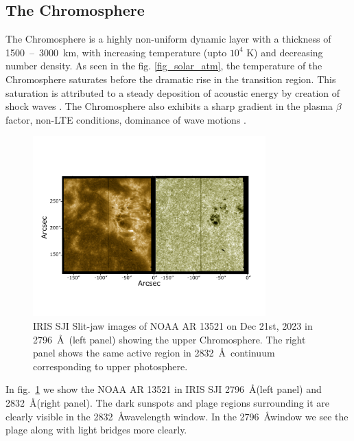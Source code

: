\subsection{The Chromosphere}\label{chromosphere}

The Chromosphere is a highly non-uniform dynamic layer with a thickness of 1500~--~3000~km, with increasing temperature (upto $10^{4}$ K) and decreasing number density. As seen in the fig. \ref{fig_solar_atm}, the temperature of the Chromosphere saturates before the dramatic rise in the transition region. This saturation is attributed to a steady deposition of acoustic energy by creation of shock waves \citep{carlsson07}. The Chromosphere also exhibits a sharp gradient in the plasma $\beta$ factor, non-LTE conditions, dominance of wave motions . 

\begin{figure}[ht!]
    \centering
    \includegraphics[trim={1cm 3cm 2cm 5cm},clip,width=0.8\textwidth]{Figures/sji_images.pdf}
    \caption{IRIS SJI Slit-jaw images of NOAA AR 13521 on Dec 21st, 2023 in  2796~\AA~(left panel) showing the upper Chromosphere. The right panel shows the same active region in 2832~\AA~continuum corresponding to upper photosphere.}
    \label{fig:sji_features}
\end{figure}

In fig.~\ref{fig:sji_features} we show the NOAA AR 13521 in IRIS SJI 2796~\AA (left panel) and 2832~\AA (right panel). The dark sunspots and plage regions surrounding it are clearly visible in the 2832~\AA wavelength window. In the 2796~\AA window we see the plage along with light bridges more clearly. 

